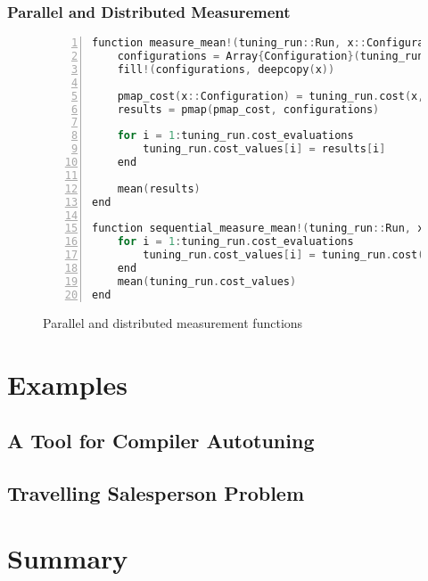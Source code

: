 \subsubsection{Parallel and Distributed Measurement}

\begin{figure}[htpb]
    \begin{minipage}{\linewidth}
    \begin{lstlisting}[language=C, basicstyle=\ttfamily\scriptsize,
        numbers=left,
        frame=no, showspaces=false, showstringspaces=false,
        numberstyle=\scriptsize,
        xleftmargin=1.5cm,
        keywords={%
            @spawnat, remotecall, Nullable, Any,
            @fetch, Future, Array, Float64, julia,
            while, true, function, end, put!,
            take!, sleep, RemoteChannel, Channel,
            Int, Tuple, const, addprocs, @schedule,
            @everywhere, for, in, myid, @async,
            remote_do, workers, Result, Real,
            AbstractFloat, deepcopy, rand, exp, true,
            Function, false, Run, Array, Configuration,
            pmap, mean, return%
        },
        otherkeywords={::, \&, \*, +, -, /, [, ], >, <, put!, take!, neighbor!,
                       update!}
    ]
function measure_mean!(tuning_run::Run, x::Configuration)
    configurations = Array{Configuration}(tuning_run.cost_evaluations)
    fill!(configurations, deepcopy(x))

    pmap_cost(x::Configuration) = tuning_run.cost(x, tuning_run.cost_arguments)
    results = pmap(pmap_cost, configurations)

    for i = 1:tuning_run.cost_evaluations
        tuning_run.cost_values[i] = results[i]
    end

    mean(results)
end

function sequential_measure_mean!(tuning_run::Run, x::Configuration)
    for i = 1:tuning_run.cost_evaluations
        tuning_run.cost_values[i] = tuning_run.cost(x, tuning_run.cost_arguments)
    end
    mean(tuning_run.cost_values)
end
    \end{lstlisting}
    \end{minipage}
    \caption{Parallel and distributed measurement functions}
    \label{fig:measurement}
\end{figure}

\section{Examples}
\label{sec:nodal-examples}

\subsection{A Tool for Compiler Autotuning}
\label{sec:nodal-gpu-tuner}

\subsection{Travelling Salesperson Problem}
\label{sec:tsp}

\section{Summary}
\label{sec:concl}
